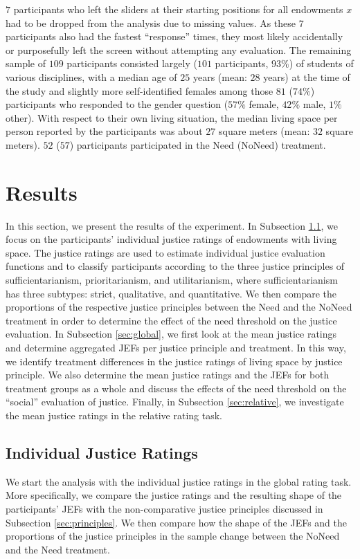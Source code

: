 \documentclass[12pt]{scrartcl}
\begin{document}
$7$ participants who left the sliders at their starting positions for all endowments $x$ had to be dropped from the analysis due to missing values.
As these $7$ participants also had the fastest ``response'' times, they most likely accidentally or purposefully left the screen without attempting any evaluation.
The remaining sample of $109$ participants consisted largely ($101$ participants, $93\%$) of students of various disciplines, with a median age of $25$ years (mean: $28$ years) at the time of the study and slightly more self-identified females among those $81$ ($74\%$) participants who responded to the gender question ($57\%$ female, $42\%$ male, $1\%$ other).
With respect to their own living situation, the median living space per person reported by the participants was about $27$ square meters (mean: $32$ square meters).
$52$ ($57$) participants participated in the Need (NoNeed) treatment.


\section{Results}\label{sec:results}
In this section, we present the results of the experiment.
In Subsection \ref{sec:individual}, we focus on the participants' individual justice ratings of endowments with living space.
The justice ratings are used to estimate individual justice evaluation functions and to classify participants according to the three justice principles of sufficientarianism, prioritarianism, and utilitarianism, where sufficientarianism has three subtypes: strict, qualitative, and quantitative.
We then compare the proportions of the respective justice principles between the Need and the NoNeed treatment in order to determine the effect of the need threshold on the justice evaluation.
In Subsection \ref{sec:global}, we first look at the mean justice ratings and determine aggregated JEFs per justice principle and treatment.
In this way, we identify treatment differences in the justice ratings of living space by justice principle.
We also determine the mean justice ratings and the JEFs for both treatment groups as a whole and discuss the effects of the need threshold on the ``social'' evaluation of justice.
Finally, in Subsection \ref{sec:relative}, we investigate the mean justice ratings in the relative rating task.


\subsection{Individual Justice Ratings}\label{sec:individual}
We start the analysis with the individual justice ratings in the global rating task.
More specifically, we compare the justice ratings and the resulting shape of the participants' JEFs with the non-comparative justice principles discussed in Subsection \ref{sec:principles}.
We then compare how the shape of the JEFs and the proportions of the justice principles in the sample change between the NoNeed and the Need treatment.
\end{document}
